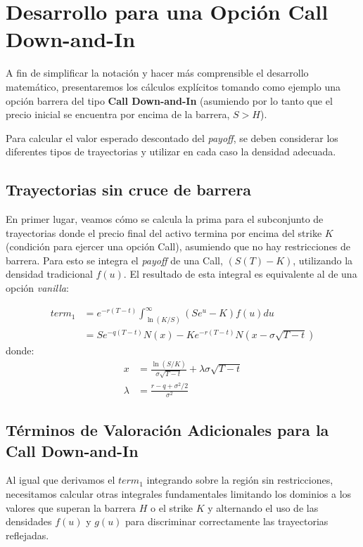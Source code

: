 \section{Desarrollo para una Opción Call Down-and-In}

A fin de simplificar la notación y hacer más comprensible el desarrollo matemático, presentaremos los cálculos explícitos tomando como ejemplo una opción barrera del tipo \textbf{Call Down-and-In} (asumiendo por lo tanto que el precio inicial se encuentra por encima de la barrera, $S > H$). 

Para calcular el valor esperado descontado del \textit{payoff}, se deben considerar los diferentes tipos de trayectorias y utilizar en cada caso la densidad adecuada.

\subsection{Trayectorias sin cruce de barrera}

En primer lugar, veamos cómo se calcula la prima para el subconjunto de trayectorias donde el precio final del activo termina por encima del strike $K$ (condición para ejercer una opción Call), asumiendo que no hay restricciones de barrera. Para esto se integra el \textit{payoff} de una Call, $(S(T) - K)$, utilizando la densidad tradicional $f(u)$. El resultado de esta integral es equivalente al de una opción \textit{vanilla}:

\begin{align}
\label{eq:termino_1}
term_1 &= e^{-r(T-t)} \int_{\ln(K/S)}^{\infty} (S e^u - K) f(u) du \nonumber \\
&= S e^{-q(T-t)} N(x) - K e^{-r(T-t)} N(x - \sigma\sqrt{T-t})
\end{align}
donde:
\begin{align*}
x &= \frac{\ln(S/K)}{\sigma \sqrt{T-t}} + \lambda\sigma \sqrt{T-t} \\
\lambda &= \frac{r - q + \sigma^2/2}{\sigma^2}
\end{align*}

\subsection{Términos de Valoración Adicionales para la Call Down-and-In}

Al igual que derivamos el $term_1$ integrando sobre la región sin restricciones, necesitamos calcular otras integrales fundamentales limitando los dominios a los valores que superan la barrera $H$ o el strike $K$ y alternando el uso de las densidades $f(u)$ y $g(u)$ para discriminar correctamente las trayectorias reflejadas.

